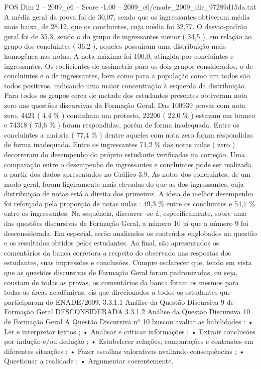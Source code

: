 \begin{textsample}{POS Dim 2 – 2009\_c6 – Score -1.00 – 2009\_c6/enade\_2009\_dir\_97289d15da.txt}
A média geral da prova foi de 30,07, sendo que os ingressantes obtiveram média mais baixa, de 28,12, que os concluintes, cuja média foi 32,77.
O desvio-padrão geral foi de 35,3, sendo o do grupo de ingressantes menor ( 34,5 ), em relação ao grupo dos concluintes ( 36,2 ), aqueles possuíram uma distribuição mais homogênea nas notas.
A nota máxima foi 100,0, atingida por concluintes e ingressantes.
Os coeficientes de assimetria para os dois grupos considerados, o de concluintes e o de ingressantes, bem como para a população como um todos são todos positivos, indicando uma maior concentração à esquerda da distribuição.
Para todos os grupos cerca de metade dos estudantes presentes obtiveram nota zero nas questões discursivas da Formação Geral.
Das 100939 provas com nota zero, 4421 ( 4,4 \% ) continham um protesto, 22200 ( 22,0 \% ) estavam em branco e 74318 ( 73,6 \% ) foram respondidas, porém de forma inadequada.
Entre os concluintes a maioria ( 77,4 \% ) dentre aqueles com nota zero foram respondidas de forma inadequada.
Entre os ingressantes 71,2 \% das notas nulas ( zero ) decorreram do desempenho do próprio estudante verificadas na correção.
Uma comparação entre o desempenho de ingressantes e concluintes pode ser realizada a partir dos dados apresentados no Gráfico 3.9.
As notas dos concluintes, de um modo geral, foram ligeiramente mais elevadas do que as dos ingressantes, cuja distribuição de notas está à direita dos primeiros.
A ideia de melhor desempenho foi reforçada pela proporção de notas nulas : 49,3 \% entre os concluintes e 54,7 \% entre os ingressantes.
Na sequência, discorrer -se-á, especificamente, sobre uma das questões discursivas de Formação Geral, a número 10 já que a número 9 foi desconsiderada.
Em especial, serão analisados os conteúdos englobados na questão e os resultados obtidos pelos estudantes.
Ao final, são apresentados os comentários da banca corretora a respeito do observado nas respostas dos estudantes, suas impressões e conclusões.
Cumpre esclarecer que, tendo em vista que as questões discursivas de Formação Geral foram padronizadas, ou seja, constam de todas as provas, os comentários da banca foram os mesmos para todas as áreas acadêmicas, eis que direcionados a todos os estudantes que participaram do ENADE/2009. 3.3.1.1 Análise da Questão Discursiva 9 de Formação Geral DESCONSIDERADA 3.3.1.2 Análise da Questão Discursiva 10 de Formação Geral A Questão Discursiva nº 10 buscou avaliar as habilidades : • Ler e interpretar textos ; • Analisar e criticar informações ; • Extrair conclusões por indução e/ou dedução ; • Estabelecer relações, comparações e contrastes em diferentes situações ; • Fazer escolhas valorativas avaliando consequências ; • Questionar a realidade ; • Argumentar coerentemente.

\end{textsample}
